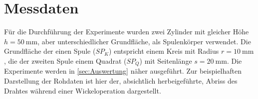 \section{Messdaten}
\label{sec:Messdaten}

Für die Durchführung der Experimente wurden zwei Zylinder mit gleicher Höhe $h=50~\si{\milli\metre}$, aber unterschiedlicher Grundfläche, als Spulenkörper verwendet. Die Grundfläche der einen Spule ($SP_K$) entspricht einem Kreis mit Radius $r=10~\si{\milli\metre}$, die der zweiten Spule einem Quadrat ($SP_Q$) mit Seitenlänge $s=20~\si{\milli\metre}$. Die Experimente werden in \autoref{sec:Auswertung} näher ausgeführt. Zur beispielhaften Darstellung der Rohdaten ist hier der, absichtlich herbeigeführte, Abriss des Drahtes während einer Wickeloperation dargestellt.

